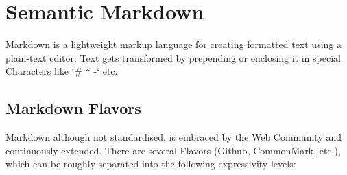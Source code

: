 \chapter{Semantic Markdown} \label{ch:markdown}






Markdown is a lightweight markup language for creating formatted text using a plain-text editor. Text gets transformed by prepending or enclosing it in special Characters like `\# * -` etc.

\section{Markdown Flavors}

Markdown although not standardised, is embraced by the Web Community and continuously extended. There are several Flavors (Github, CommonMark, etc.), which can be roughly separated into the following expressivity levels:

